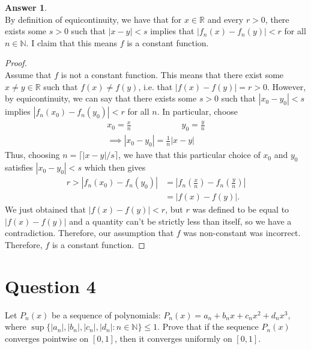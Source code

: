 \documentclass[10pt,a4paper]{article}
\theoremstyle{definition}
\newtheorem*{answer*}{Answer}
\theoremstyle{definition}
\numberwithin{equation}{section}
\begin{document}
\begin{answer*}$ $
\\By definition of equicontinuity, we have that for $x \in \mathbb{R}$ and every $r > 0$, there exists some $s > 0$ such that $|x - y| < s$ implies that $|f_n(x) - f_n(y)| < r$ for all $n \in \mathbb{N}$. I claim that this means $f$ is a constant function. 
\end{answer*}

\begin{proof}$ $
\\Assume that $f$ is not a constant function. This means that there exist some $x \neq y \in \mathbb{R}$ such that $f(x) \neq f(y)$, i.e. that $|f(x) - f(y)| = r > 0$. However, by equicontinuity, we can say that there exists some $s > 0$ such that $|x_0 - y_0| < s$ implies $|f_n(x_0) - f_n(y_0)| < r$ for all $n$. In particular, choose 
\begin{align*}
x_0 = \frac{x}{n} \qquad \qquad \qquad  y_0 = \frac{y}{n}\\
\implies |x_0 - y_0| = \frac{1}{n}|x - y|
\end{align*}
Thus, choosing $n = \lceil |x - y|/s \rceil$, we have that this particular choice of $x_0$ and $y_0$ satisfies $|x_0 - y_0| < s$ which then gives
\begin{align*}
r > |f_n(x_0) - f_n(y_0)| &= \left| f_n\left(\frac{x}{n}\right) - f_n\left(\frac{y}{n}\right) \right|\\
&= |f(x) - f(y)|.
\end{align*}
We just obtained that $|f(x) - f(y)| < r$, but $r$ was defined to be equal to $|f(x) - f(y)|$ and a quantity can't be strictly less than itself, so we have a contradiction. Therefore, our assumption that $f$ was non-constant was incorrect. Therefore, $f$ is a constant function. 
\end{proof}

\section*{Question 4}
Let $P_n(x)$ be a sequence of polynomials: $P_n(x) = a_n + b_nx + c_nx^2 + d_nx^3$, where $\sup\{|a_n|, |b_n|, |c_n|, |d_n| : n \in \mathbb{N}\} \leq 1$. Prove that if the sequence $P_n(x)$ converges pointwise on $[0, 1]$, then it converges uniformly on $[0, 1]$.
\end{document}
